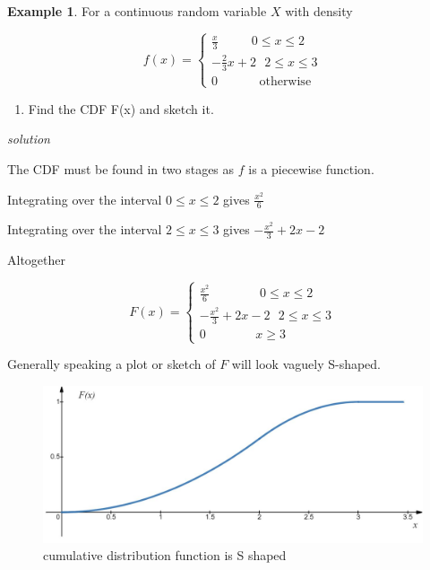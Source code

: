 \documentclass[
]{book}
\providecommand{\tightlist}{%
  \setlength{\itemsep}{0pt}\setlength{\parskip}{0pt}}
\theoremstyle{definition}
\theoremstyle{definition}
\newtheorem{example}{Example}[chapter]
\theoremstyle{definition}
\theoremstyle{definition}
\theoremstyle{remark}
\begin{document}
\begin{example}
For a continuous random variable \(X\) with density

\begin{equation*}
  f(x)=\begin{cases}
        \frac{x}{3} \ \ \ \ \ \ \ \ \ \ \ \ 0\leq x\leq 2  \\
        -\frac{2}{3}x+2 \ \ \   2\leq x \leq 3\\
        0 \ \ \ \ \ \ \ \ \ \ \ \  \ \ \ \text{otherwise}
  \end{cases}
\end{equation*}

\begin{enumerate}
\def\labelenumi{\alph{enumi})}
\tightlist
\item
  Find the CDF F(x) and sketch it.
\end{enumerate}

\emph{solution}

The CDF must be found in two stages as \(f\) is a piecewise function.

Integrating over the interval \(0\leq x\leq 2\) gives \(\frac{x^2}{6}\)

Integrating over the interval \(2\leq x \leq 3\) gives \(-\frac{x^2}{3} +2x -2\)

Altogether

\begin{equation*}
  F(x)=\begin{cases}
        \frac{x^2}{6} \ \ \ \ \ \ \ \ \ \ \ \ \ \ \ \ \ \ 0\leq x\leq 2  \\
        -\frac{x^2}{3} +2x -2 \ \ \   2\leq x \leq 3\\
        0 \ \ \ \ \ \ \ \ \ \  \ \ \ \ \  \ \ \ x\geq 3
  \end{cases}
\end{equation*}
\end{example}

Generally speaking a plot or sketch of \(F\) will look vaguely S-shaped.

\begin{figure}

{\centering \includegraphics[width=0.75\linewidth]{./figures/cum1} 

}

\caption{cumulative distribution function is S shaped}\label{fig:cum1}
\end{figure}
\end{document}
